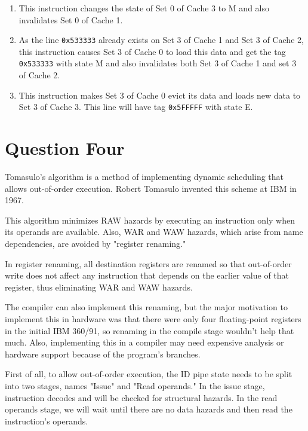\documentclass[12pt]{article}
\begin{document}
\begin{enumerate}[label=\alph*.]
\begin{enumerate}[label=\arabic*.]
	\item This instruction changes the state of Set 0 of Cache 3 to M and also invalidates Set 0 of Cache 1.
	
	\item
	As the line \Verb+0x533333+ already exists on Set 3 of Cache 1 and Set 3 of Cache 2, this instruction causes Set 3 of Cache 0 to load this data and get the tag \Verb+0x533333+ with state M and also invalidates both Set 3 of Cache 1 and set 3 of Cache 2.
	
	\item
	This instruction makes Set 3 of Cache 0 evict its data and loads new data to Set 3 of Cache 3. This line will have tag \Verb+0x5FFFFF+ with state E.
\end{enumerate}

\end{enumerate}
	
	
	
\newpage

\section{Question Four}
Tomasulo's algorithm is a method of implementing dynamic scheduling that allows out-of-order execution. Robert Tomasulo invented this scheme at IBM in 1967.

This algorithm minimizes RAW hazards by executing an instruction only when its operands are available. Also, WAR and WAW hazards, which arise from name dependencies, are avoided by "register renaming."

In register renaming, all destination registers are renamed so that out-of-order write does not affect any instruction that depends on the earlier value of that register, thus eliminating WAR and WAW hazards.

The compiler can also implement this renaming, but the major motivation to implement this in hardware was that there were only four floating-point registers in the initial IBM 360/91, so renaming in the compile stage wouldn't help that much. Also, implementing this in a compiler may need expensive analysis or hardware support because of the program's branches.

First of all, to allow out-of-order execution, the ID pipe state needs to be split into two stages, names "Issue" and "Read operands." In the issue stage, instruction decodes and will be checked for structural hazards. In the read operands stage, we will wait until there are no data hazards and then read the instruction's operands.
\end{document}
